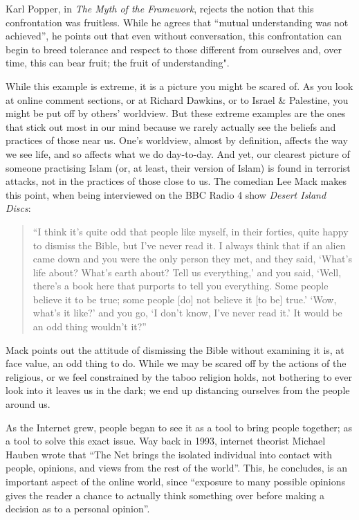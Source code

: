 \documentclass[]{article}
\begin{document}
Karl Popper, in \emph{The Myth of the Framework}, rejects the notion
that this confrontation was fruitless. While he agrees that ``mutual
understanding was not
achieved''\autocite[pg 37]{PopperMythFrameworkdefence1997}, he points
out that even without conversation, this confrontation can begin to
breed tolerance and respect to those different from ourselves and, over
time, this can bear fruit; the fruit of
understanding"\autocite{PopperMythFrameworkdefence1997}.

While this example is extreme, it is a picture you might be scared of.
As you look at online comment sections, or at Richard Dawkins, or to
Israel \& Palestine, you might be put off by others' worldview. But
these extreme examples are the ones that stick out most in our mind
because we rarely actually see the beliefs and practices of those near
us. One's worldview, almost by definition, affects the way we see life,
and so affects what we do day-to-day. And yet, our clearest picture of
someone practising Islam (or, at least, their version of Islam) is found
in terrorist attacks, not in the practices of those close to us. The
comedian Lee Mack makes this point, when being interviewed on the BBC
Radio 4 show \emph{Desert Island Discs}:

\begin{quote}
``I think it's quite odd that people like myself, in their forties,
quite happy to dismiss the Bible, but I've never read it. I always think
that if an alien came down and you were the only person they met, and
they said, `What's life about? What's earth about? Tell us everything,'
and you said, `Well, there's a book here that purports to tell you
everything. Some people believe it to be true; some people {[}do{]} not
believe it {[}to be{]} true.' `Wow, what's it like?' and you go, `I
don't know, I've never read it.' It would be an odd thing wouldn't
it?''\autocite{BBCRadio4DesertIslandDiscs13}
\end{quote}

Mack points out the attitude of dismissing the Bible without examining
it is, at face value, an odd thing to do. While we may be scared off by
the actions of the religious, or we feel constrained by the taboo
religion holds, not bothering to ever look into it leaves us in the
dark; we end up distancing ourselves from the people around us.

As the Internet grew, people began to see it as a tool to bring people
together; as a tool to solve this exact issue. Way back in 1993,
internet theorist Michael Hauben wrote that ``The Net brings the
isolated individual into contact with people, opinions, and views from
the rest of the world''\autocite{HaubenNetNetizensImpact1993}. This, he
concludes, is an important aspect of the online world, since ``exposure
to many possible opinions gives the reader a chance to actually think
something over before making a decision as to a personal
opinion''\autocite{HaubenNetNetizensImpact1993}.
\end{document}
